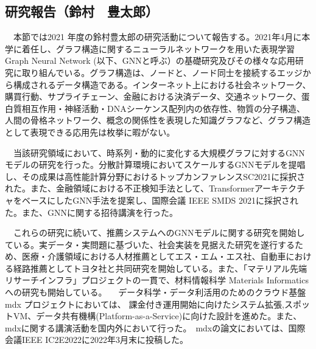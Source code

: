 
\subsection{研究報告（鈴村　豊太郎）}

　本節では2021 年度の鈴村豊太郎の研究活動について報告する。2021年4月に本学に着任し、グラフ構造に関するニューラルネットワークを用いた表現学習 Graph Neural Network (以下、GNNと呼ぶ）の基礎研究及びその様々な応用研究に取り組んでいる。グラフ構造は、ノードと、ノード同士を接続するエッジから構成されるデータ構造である。インターネット上における社会ネットワーク、購買行動、サプライチェーン、金融における決済データ、交通ネットワーク、蛋白質相互作用・神経活動・DNAシーケンス配列内の依存性、物質の分子構造、人間の骨格ネットワーク、概念の関係性を表現した知識グラフなど、グラフ構造として表現できる応用先は枚挙に暇がない。
\par
　当該研究領域において、時系列・動的に変化する大規模グラフに対するGNNモデルの研究を行った。分散計算環境においてスケールするGNNモデルを提唱し、その成果は高性能計算分野におけるトップカンファレンスSC2021\cite{suzumura-sc2021}に採択された。また、金融領域における不正検知手法として、TransformerアーキテクチャをベースにしたGNN手法を提案し、国際会議 IEEE SMDS 2021\cite{suzumura-smds21}に採択された。また、GNNに関する招待講演\cite{suzumura-canon2021}を行った。

　これらの研究に続いて、推薦システムへのGNNモデルに関する研究を開始している。実データ・実問題に基づいた、社会実装を見据えた研究を遂行するため、医療・介護領域における人材推薦としてエス・エム・エス社、自動車における経路推薦としてトヨタ社と共同研究を開始している。また、「マテリアル先端リサーチインフラ」プロジェクトの一貫で、材料情報科学 Materials Informaticsへの研究も開始している。
　データ科学・データ利活用のためのクラウド基盤 mdx プロジェクトにおいては、 課金付き運用開始に向けたシステム拡張,スポットVM、データ共有機構(Platform-as-a-Service)に向けた設計を進めた。また、mdxに関する講演活動を国内外において行った\cite{suzumura-axies2021,suzumura-nanotec2021, suzumura-nci2021}。　mdxの論文においては、国際会議IEEE IC2E2022に2022年3月末に投稿した。


